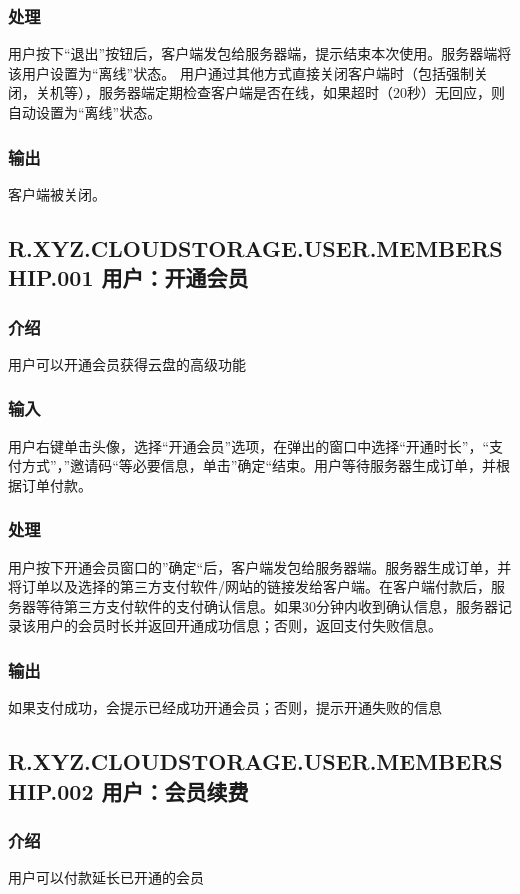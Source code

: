 \subsubsection{处理}
用户按下“退出”按钮后，客户端发包给服务器端，提示结束本次使用。服务器端将该用户设置为“离线”状态。
用户通过其他方式直接关闭客户端时（包括强制关闭，关机等），服务器端定期检查客户端是否在线，如果超时（20秒）无回应，则自动设置为“离线”状态。

\subsubsection{输出}
客户端被关闭。

{
\color{red}
\subsection{R.XYZ.CLOUDSTORAGE.USER.MEMBERSHIP.001 用户：开通会员}
\subsubsection{介绍}
用户可以开通会员获得云盘的高级功能
\subsubsection{输入}
用户右键单击头像，选择“开通会员”选项，在弹出的窗口中选择“开通时长”，“支付方式”，”邀请码“等必要信息，单击”确定“结束。用户等待服务器生成订单，并根据订单付款。
\subsubsection{处理}
用户按下开通会员窗口的”确定“后，客户端发包给服务器端。服务器生成订单，并将订单以及选择的第三方支付软件/网站的链接发给客户端。在客户端付款后，服务器等待第三方支付软件的支付确认信息。如果30分钟内收到确认信息，服务器记录该用户的会员时长并返回开通成功信息；否则，返回支付失败信息。
\subsubsection{输出}
如果支付成功，会提示已经成功开通会员；否则，提示开通失败的信息

\subsection{R.XYZ.CLOUDSTORAGE.USER.MEMBERSHIP.002 用户：会员续费}
\subsubsection{介绍}
用户可以付款延长已开通的会员
}
